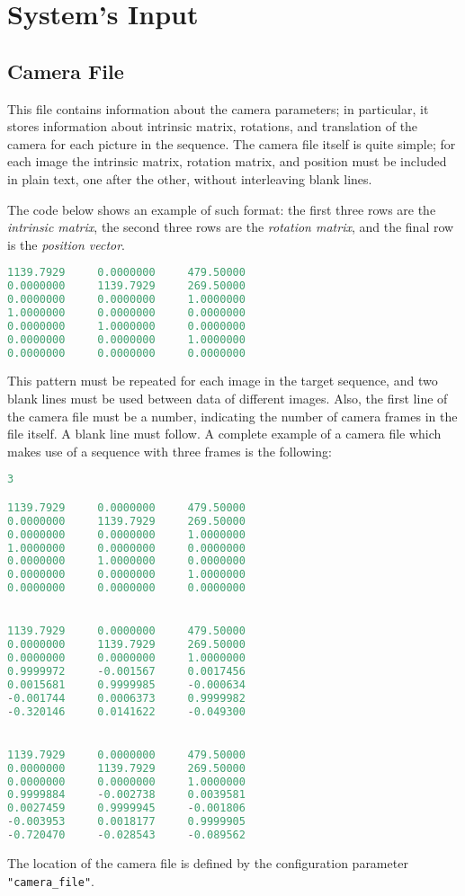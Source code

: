 \section{System's Input}
\newcommand{\ConfigParam}[1]{\texttt{"#1"}}

\subsection{Camera File}
This file contains information about the camera parameters; in particular, it stores information 
about intrinsic matrix, rotations, and translation of the camera for each picture in the sequence.
The camera file itself is quite simple; for each image the intrinsic matrix, 
rotation matrix, and position must be included in plain text, one after the other, without interleaving blank lines.

The code below shows an example of such format: the first three rows are the \emph{intrinsic matrix},
the second three rows are the \emph{rotation matrix}, and the final row is the \emph{position vector}.
\begin{lstlisting}[language=C]
1139.7929     0.0000000     479.50000
0.0000000     1139.7929     269.50000
0.0000000     0.0000000     1.0000000
1.0000000     0.0000000     0.0000000
0.0000000     1.0000000     0.0000000
0.0000000     0.0000000     1.0000000
0.0000000     0.0000000     0.0000000
\end{lstlisting}
\dotfill

This pattern must be repeated for each image in the target sequence, and two blank lines must be used between data of different images.
Also, the first line of the camera file must be a number, indicating the number of camera frames in the file itself. A blank line must follow. A complete example of a camera file which makes use of a sequence with three frames is the following:
\begin{lstlisting}[language=C]
3

1139.7929     0.0000000     479.50000
0.0000000     1139.7929     269.50000
0.0000000     0.0000000     1.0000000
1.0000000     0.0000000     0.0000000
0.0000000     1.0000000     0.0000000
0.0000000     0.0000000     1.0000000
0.0000000     0.0000000     0.0000000


1139.7929     0.0000000     479.50000
0.0000000     1139.7929     269.50000
0.0000000     0.0000000     1.0000000
0.9999972     -0.001567     0.0017456
0.0015681     0.9999985     -0.000634
-0.001744     0.0006373     0.9999982
-0.320146     0.0141622     -0.049300


1139.7929     0.0000000     479.50000
0.0000000     1139.7929     269.50000
0.0000000     0.0000000     1.0000000
0.9999884     -0.002738     0.0039581
0.0027459     0.9999945     -0.001806
-0.003953     0.0018177     0.9999905
-0.720470     -0.028543     -0.089562
\end{lstlisting}
\dotfill
\begin{Note}
The location of the camera file is defined by the configuration parameter 
\ConfigParam{camera\_file}.
\end{Note}


